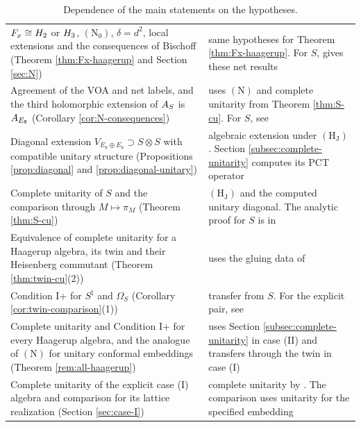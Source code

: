 \documentclass[leqno]{article}
\let\cal\relax
\newcommand{\cal}{\mathcal}
\newcommand{\ot}{\otimes}
\numberwithin{equation}{section}
\begin{document}
\begin{table}[!htbp]
\begin{tabular}{>{\raggedright\arraybackslash}p{7.9cm}>{\raggedright\arraybackslash}p{5.6cm}}
$\cal F_x \cong \cal H_2$ or $\cal H_3$, $\mathrm{(N_0)}$, $\delta=d^2$, local extensions and the consequences of Bischoff (Theorem \ref{thm:Fx-haagerup} and Section \ref{sec:N}) & same hypotheses for Theorem \ref{thm:Fx-haagerup}. For $S$, \cite[Theorem 3.1(2)--(4)]{ArhIII} gives these net results \\
Agreement of the VOA and net labels, and the third holomorphic extension of $\cal A_S$ is $\cal A_{E_8}$ (Corollary \ref{cor:N-consequences}) & uses $\mathrm{(N)}$ and complete unitarity from Theorem \ref{thm:S-cu}. For $S$, see \cite[Corollary 6.2(1)--(2)]{ArhIII} \\
Diagonal extension $V_{E_8 \oplus E_8} \supset S \ot S$ with compatible unitary structure (Propositions \ref{prop:diagonal} and \ref{prop:diagonal-unitary}) & algebraic extension under $\mathrm{(H_J)}$. Section \ref{subsec:complete-unitarity} computes its PCT operator \\
Complete unitarity of $S$ and the comparison through $M\mapsto\pi_M$ (Theorem \ref{thm:S-cu}) & $\mathrm{(H_J)}$ and the computed unitary diagonal. The analytic proof for $S$ is in \cite[Theorems 5.1 and 6.1 and Corollary 6.2(1)]{ArhIII} \\
Equivalence of complete unitarity for a Haagerup algebra, its twin and their Heisenberg commutant (Theorem \ref{thm:twin-cu}(2)) & uses the gluing data of \cite[Section 12]{Arh26} \\
Condition I+ for $S^\natural$ and $\Omega_S$ (Corollary \ref{cor:twin-comparison}(1)) & transfer from $S$. For the explicit pair, see \cite[Theorem 7.13(2)]{ArhIII} \\
Complete unitarity and Condition I+ for every Haagerup algebra, and the analogue of $\mathrm{(N)}$ for unitary conformal embeddings (Theorem \ref{rem:all-haagerup}) & uses Section \ref{subsec:complete-unitarity} in case (II) and transfers through the twin in case (I) \\
Complete unitarity of the explicit case (I) algebra and comparison for its lattice realization (Section \ref{sec:case-I}) & complete unitarity by \cite[Theorem 7.13(2)]{ArhIII}. The comparison uses unitarity for the specified embedding \\
\hline
\end{tabular}
\caption{Dependence of the main statements on the hypotheses.}
\label{tab:dependencies}
\end{table}
\end{document}
